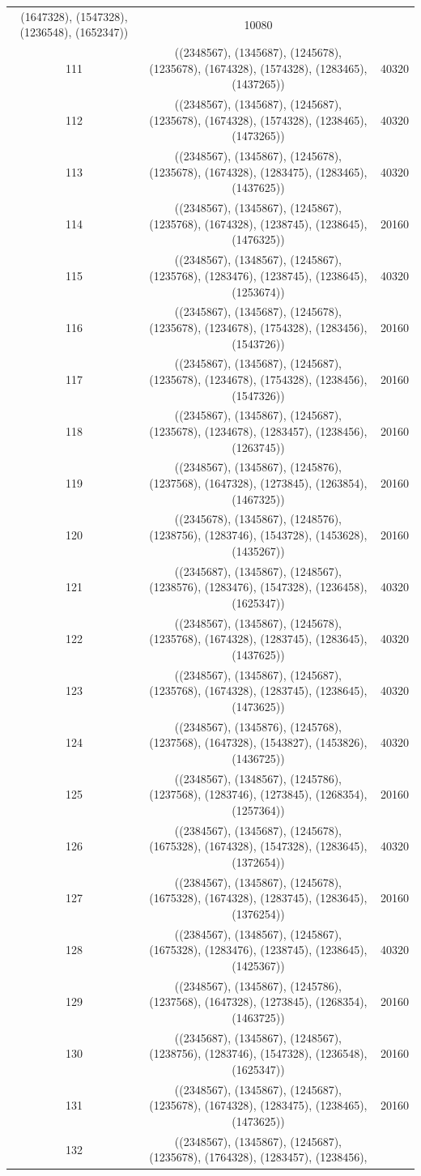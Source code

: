 \documentclass[pdftex]{sigma}
\theoremstyle{definition}
\numberwithin{equation}{section}
\begin{document}
\begin{center}
\begin{longtable}{|@{\,}c@{\,}|@{\,}c@{\,}|@{\,}c@{\,}|}
(1647328), (1547328), (1236548), (1652347)) & 10080 \\ 111 & ((2348567), (1345687), (1245678), (1235678), (1674328), (1574328), (1283465), (1437265)) & 40320 \\ 112 & ((2348567), (1345687), (1245687), (1235678), (1674328), (1574328), (1238465), (1473265)) & 40320 \\ 113 & ((2348567), (1345867), (1245678), (1235678), (1674328), (1283475), (1283465), (1437625)) & 40320 \\ 114 & ((2348567), (1345867), (1245867), (1235768), (1674328), (1238745), (1238645), (1476325)) & 20160 \\ 115 & ((2348567), (1348567), (1245867), (1235768), (1283476), (1238745), (1238645), (1253674)) & 40320 \\ 116 & ((2345867), (1345687), (1245678), (1235678), (1234678), (1754328), (1283456), (1543726)) & 20160 \\ 117 & ((2345867), (1345687), (1245687), (1235678), (1234678), (1754328), (1238456), (1547326)) & 20160 \\ 118 & ((2345867), (1345867), (1245687), (1235678), (1234678), (1283457), (1238456), (1263745)) & 20160 \\ 119 & ((2348567), (1345867), (1245876), (1237568), (1647328), (1273845), (1263854), (1467325)) & 20160 \\ 120 & ((2345678), (1345867), (1248576), (1238756), (1283746), (1543728), (1453628), (1435267)) & 20160 \\ 121 & ((2345687), (1345867), (1248567), (1238576), (1283476), (1547328), (1236458), (1625347)) & 40320 \\ 122 & ((2348567), (1345867), (1245678), (1235768), (1674328), (1283745), (1283645), (1437625)) & 40320 \\ 123 & ((2348567), (1345867), (1245687), (1235768), (1674328), (1283745), (1238645), (1473625)) & 40320 \\ 124 & ((2348567), (1345876), (1245768), (1237568), (1647328), (1543827), (1453826), (1436725)) & 40320 \\ 125 & ((2348567), (1348567), (1245786), (1237568), (1283746), (1273845), (1268354), (1257364)) & 20160 \\ 126 & ((2384567), (1345687), (1245678), (1675328), (1674328), (1547328), (1283645), (1372654)) & 40320 \\ 127 & ((2384567), (1345867), (1245678), (1675328), (1674328), (1283745), (1283645), (1376254)) & 20160 \\ 128 & ((2384567), (1348567), (1245867), (1675328), (1283476), (1238745), (1238645), (1425367)) & 40320 \\ 129 & ((2348567), (1345867), (1245786), (1237568), (1647328), (1273845), (1268354), (1463725)) & 20160 \\ 130 & ((2345687), (1345867), (1248567), (1238756), (1283746), (1547328), (1236548), (1625347)) & 20160 \\ 131 & ((2348567), (1345867), (1245687), (1235678), (1674328), (1283475), (1238465), (1473625)) & 20160 \\ 132 & ((2348567), (1345867), (1245687), (1235678), (1764328), (1283457), (1238456), 
\end{longtable}
\end{center}
\end{document}
